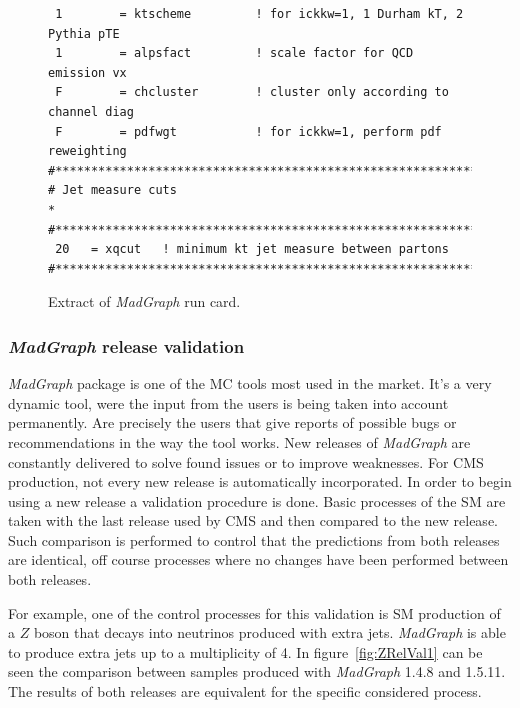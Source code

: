 \begin{itemize}
\begin{itemize}
\begin{figure}[!Hhtbp]
\begin{center}
\begin{minipage}[c]{0.7\textwidth}
\begin{verbatim}
 1        = ktscheme         ! for ickkw=1, 1 Durham kT, 2 Pythia pTE
 1        = alpsfact         ! scale factor for QCD emission vx
 F        = chcluster        ! cluster only according to channel diag
 F        = pdfwgt           ! for ickkw=1, perform pdf reweighting
#*********************************************************************
# Jet measure cuts                                                   *
#*********************************************************************
 20   = xqcut   ! minimum kt jet measure between partons
#*********************************************************************
\end{verbatim}
\normalsize
        \end{minipage}
          \caption{Extract of \textit{MadGraph} run card.}
          \label{fig:RunCard}
      \end{center}
    \end{figure}

  \end{itemize}
\end{itemize}


\subsubsection{\textit{MadGraph} release validation}

\textit{MadGraph} package is one of the MC tools most used in the market. It's a very dynamic tool, were the input from the users is being taken into account permanently. Are precisely the users that give reports of possible bugs or recommendations in the way the tool works. New releases of \textit{MadGraph} are constantly delivered to solve found issues or to improve weaknesses. For CMS production, not every new release is automatically incorporated. In order to begin using a new release a validation procedure is done. Basic processes of the SM are taken with the last release used by CMS and then compared to the new release. Such comparison is performed to control that the predictions from both releases are identical, off course processes where no changes have been performed between both releases. 

For example, one of the control processes for this validation is SM production of a $Z$ boson that decays into neutrinos produced with extra jets. \textit{MadGraph} is able to produce extra jets up to a multiplicity of 4. In figure~\ref{fig:ZRelVal1} can be seen the comparison between samples produced with \textit{MadGraph} 1.4.8 and 1.5.11. The results of both releases are equivalent for the specific considered process.

